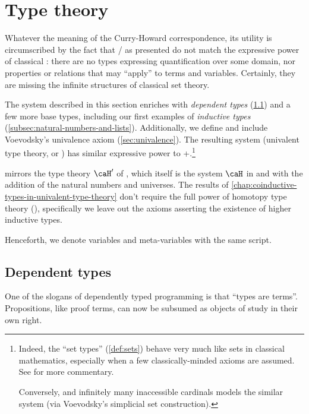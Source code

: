 \documentclass[./thesis.tex]{subfiles}
\begin{document}
\chapter{Type theory}
\label{chap:type-theory}

Whatever the meaning of the Curry-Howard correspondence, its utility is
circumscribed by the fact that \IPL{}/\TLC{} as
presented do not match the expressive power of classical \FOL{}:
there are no types expressing quantification over some domain, nor properties
or relations that may ``apply'' to terms and variables. Certainly, they are
missing the infinite structures of classical set theory.

The system described in this section enriches \TLC{} with
\textit{dependent types} (\cref{sec:dependent-types}) and a few more base types,
including our first examples of \textit{inductive types}
(\cref{subsec:natural-numbers-and-lists}). Additionally, we define and include
Voevodsky's univalence axiom (\cref{sec:univalence}). The
resulting system (univalent type theory, or \UTT{}) has similar
expressive power to \ZFC{}+\FOL{}.\footnote{Indeed, the
  ``set types'' (\cref{def:sets}) behave very much like sets in classical
  mathematics, especially when a few classically-minded axioms are assumed. See
  \cite{book} for more commentary.

  Conversely, \ZFC{} and infinitely many inaccessible cardinals models the
  similar system \HoTT{} (via Voevodsky's simplicial set construction).}

\UTT{} mirrors the type theory $\caH'$ of \cite{homotopy-limits}, which itself
is the system $\caH$ in \cite{inductive} and \cite{homotopy-initial} with the
addition of the natural numbers and universes. The results of
\cref{chap:coinductive-types-in-univalent-type-theory} don't
require the full power of homotopy type theory (\HoTT), specifically we leave
out the axioms asserting the existence of higher inductive types.

\begin{notation}
  Henceforth, we denote variables and meta-variables with the same
  script.
\end{notation}

\section{Dependent types}
\label{sec:dependent-types}

One of the slogans of dependently typed programming is that ``types are
terms''. Propositions, like proof terms, can now be subsumed as objects of study
in their own right.
\end{document}

